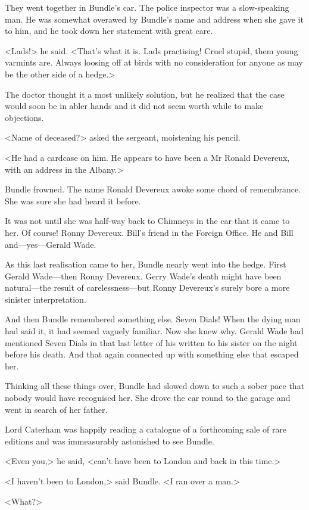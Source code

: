 They went together in Bundle's car. The police inspector was a slow-speaking man. He was somewhat overawed by Bundle's name and address when she gave it to him, and he took down her statement with great care.

<Lads!> he said. <That's what it is. Lads practising! Cruel stupid, them young varmints are. Always loosing off at birds with no consideration for anyone as may be the other side of a hedge.>

The doctor thought it a most unlikely solution, but he realized that the case would soon be in abler hands and it did not seem worth while to make objections.

<Name of deceased?> asked the sergeant, moistening his pencil.

<He had a cardcase on him. He appears to have been a Mr Ronald Devereux, with an address in the Albany.>

Bundle frowned. The name Ronald Devereux awoke some chord of remembrance. She was sure she had heard it before.

It was not until she was half-way back to Chimneys in the car that it came to her. Of course! Ronny Devereux. Bill's friend in the Foreign Office. He and Bill and—yes—Gerald Wade.

As this last realisation came to her, Bundle nearly went into the hedge. First Gerald Wade—then Ronny Devereux. Gerry Wade's death might have been natural—the result of carelessness—but Ronny Devereux's surely bore a more sinister interpretation.

And then Bundle remembered something else. Seven Dials! When the dying man had said it, it had seemed vaguely familiar. Now she knew why. Gerald Wade had mentioned Seven Dials in that last letter of his written to his sister on the night before his death. And that again connected up with something else that escaped her.

Thinking all these things over, Bundle had slowed down to such a sober pace that nobody would have recognised her. She drove the car round to the garage and went in search of her father.

Lord Caterham was happily reading a catalogue of a forthcoming sale of rare editions and was immeasurably astonished to see Bundle.

<Even you,> he said, <can't have been to London and back in this time.>

<I haven't been to London,> said Bundle. <I ran over a man.>

<What?>

